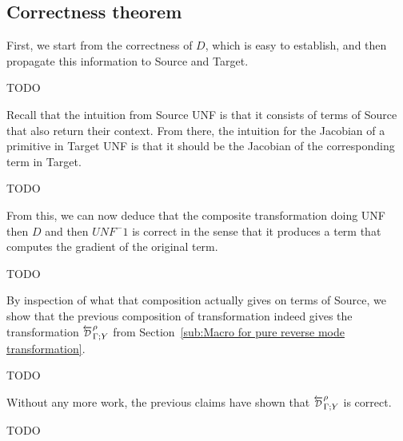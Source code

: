 \subsection{Correctness theorem} %
\label{sub:Correctness theorem}

First, we start from the correctness of $D$, which is easy to establish, 
and then propagate this information to Source and Target.

\begin{proposition}[Correctness $D$]
    TODO
\end{proposition}

Recall that the intuition from Source UNF is that it consists of terms of Source that also return their context.
From there, the intuition for the Jacobian of a primitive in Target UNF is that it should be the Jacobian of
the corresponding term in Target. 


\begin{proposition}
    TODO
\end{proposition}

From this, we can now deduce that the composite transformation doing UNF then $D$ and then $UNF^-1$ is correct
in the sense that it produces a term that computes the gradient of the original term.

\begin{theorem}
    TODO
\end{theorem}

By inspection of what that composition actually gives on terms of Source, 
we show that the previous composition of transformation indeed gives the transformation 
$\directD{\rho}{\Gamma}{Y}$ from Section~\ref{sub:Macro for pure reverse mode transformation}. 

\begin{proposition}[UNF;D;$UNF^-1$=D]
    TODO
\end{proposition}

Without any more work, the previous claims have shown that 
$\directD{\rho}{\Gamma}{Y}$ is correct.

\begin{theorem}[D is correct]
    TODO
\end{theorem}